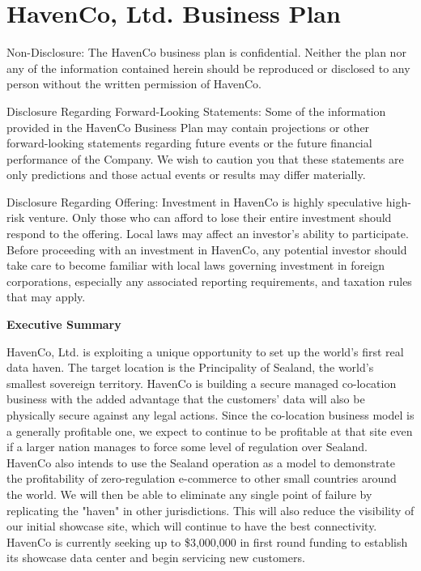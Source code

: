 
\chapter{HavenCo, Ltd. Business Plan}
\label{ch:havenco}

Non-Disclosure: The HavenCo business plan is confidential.  Neither the plan nor any of the information contained herein should be reproduced or disclosed to any person without the written permission of HavenCo.

Disclosure Regarding Forward-Looking Statements: Some of the information provided in the HavenCo Business Plan may contain projections or other forward-looking statements regarding future events or the future financial performance of the Company. We wish to caution you that these statements are only predictions and those actual events or results may differ materially.

Disclosure Regarding Offering: Investment in HavenCo is highly speculative high-risk venture. Only those who can afford to lose their entire investment should respond to the offering. Local laws may affect an investor's ability to participate. Before proceeding with an investment in HavenCo, any potential investor should take care to become familiar with local laws governing investment in foreign corporations, especially any associated reporting requirements, and taxation rules that may apply.

\textbf{Executive Summary}
 
HavenCo, Ltd. is exploiting a unique opportunity to set up the world's first real data haven. The target location is the Principality of Sealand, the world's smallest sovereign territory. HavenCo is building a secure managed co-location business with the added advantage that the customers' data will also be physically secure against any legal actions. Since the co-location business model is a generally profitable one, we expect to continue to be profitable at that site even if a larger nation manages to force some level of regulation over Sealand. HavenCo also intends to use the Sealand operation as a model to demonstrate the profitability of zero-regulation e-commerce to other small countries around the world. We will then be able to eliminate any single point of failure by replicating the "haven" in other jurisdictions. This will also reduce the visibility of our initial showcase site, which will continue to have the best connectivity. HavenCo is currently seeking up to \$3,000,000 in first round funding to establish its showcase data center and begin servicing new customers.

